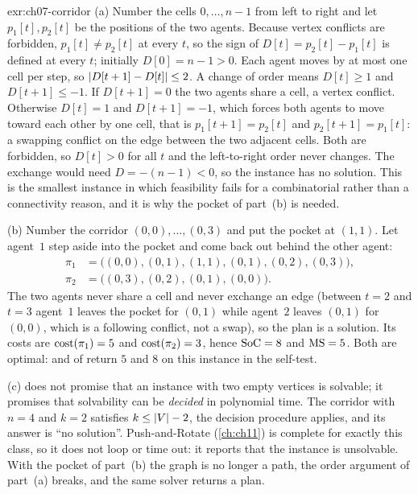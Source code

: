\begin{solution}{exr:ch07-corridor}
(a) Number the cells $0,\dots,n-1$ from left to right and let $p_1[t],p_2[t]$ be the positions of the two agents. Because vertex conflicts are forbidden, $p_1[t]\ne p_2[t]$ at every $t$, so the sign of $D[t]=p_2[t]-p_1[t]$ is defined at every $t$; initially $D[0]=n-1>0$. Each agent moves by at most one cell per step, so $\left\lvert D[t+1]-D[t] \right\rvert\le 2$. A change of order means $D[t]\ge 1$ and $D[t+1]\le -1$. If $D[t+1]=0$ the two agents share a cell, a vertex conflict. Otherwise $D[t]=1$ and $D[t+1]=-1$, which forces both agents to move toward each other by one cell, that is $p_1[t+1]=p_2[t]$ and $p_2[t+1]=p_1[t]$: a swapping conflict on the edge between the two adjacent cells. Both are forbidden, so $D[t]>0$ for all $t$ and the left-to-right order never changes. The exchange would need $D=-(n-1)<0$, so the instance has no solution. This is the smallest instance in which feasibility fails for a combinatorial rather than a connectivity reason, and it is why the pocket of part~(b) is needed.

(b) Number the corridor $(0,0),\dots,(0,3)$ and put the pocket at $(1,1)$. Let agent~$1$ step aside into the pocket and come back out behind the other agent:
\begin{align*}
  \pi_1 &= \bigl((0,0),(0,1),(1,1),(0,1),(0,2),(0,3)\bigr),\\
  \pi_2 &= \bigl((0,3),(0,2),(0,1),(0,0)\bigr).
\end{align*}
The two agents never share a cell and never exchange an edge (between $t=2$ and $t=3$ agent~$1$ leaves the pocket for $(0,1)$ while agent~$2$ leaves $(0,1)$ for $(0,0)$, which is a following conflict, not a swap), so the plan is a solution. Its costs are $\operatorname{cost}(\pi_1)=5$ and $\operatorname{cost}(\pi_2)=3$, hence $\mathrm{SoC}=8$ and $\mathrm{MS}=5$. Both are optimal:  and  of  return $5$ and $8$ on this instance in the self-test.

(c)  does not promise that an instance with two empty vertices is solvable; it promises that solvability can be \emph{decided} in polynomial time. The corridor with $n=4$ and $k=2$ satisfies $k \le \left\lvert V \right\rvert-2$, the decision procedure applies, and its answer is ``no solution''. Push-and-Rotate (\cref{ch:ch11}) is complete for exactly this class, so it does not loop or time out: it reports that the instance is unsolvable. With the pocket of part~(b) the graph is no longer a path, the order argument of part~(a) breaks, and the same solver returns a plan.
\end{solution}
